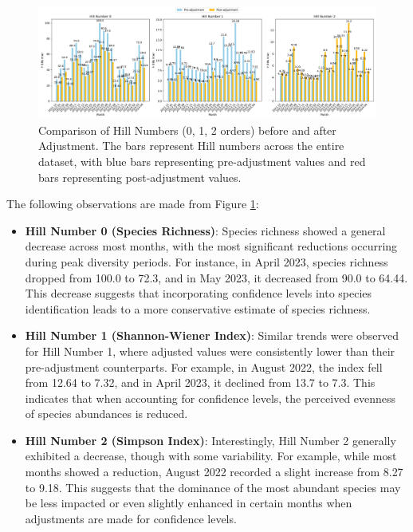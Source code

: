 \documentclass[a4paper,12pt]{article}
\begin{document}
\begin{figure}[H]
\centering
\includegraphics[width=1.0\textwidth]{Figures/Hill_Number.png}
\caption{Comparison of Hill Numbers (0, 1, 2 orders) before and after Adjustment. The bars represent Hill numbers across the entire dataset, with blue bars representing pre-adjustment values and red bars representing post-adjustment values.}
\label{fig:hill_numbers}
\end{figure}

The following observations are made from Figure \ref{fig:hill_numbers}:

\begin{itemize}
    \item \textbf{Hill Number 0 (Species Richness)}: Species richness showed a general decrease across most months, with the most significant reductions occurring during peak diversity periods. For instance, in April 2023, species richness dropped from 100.0 to 72.3, and in May 2023, it decreased from 90.0 to 64.44. This decrease suggests that incorporating confidence levels into species identification leads to a more conservative estimate of species richness.

    \item \textbf{Hill Number 1 (Shannon-Wiener Index)}: Similar trends were observed for Hill Number 1, where adjusted values were consistently lower than their pre-adjustment counterparts. For example, in August 2022, the index fell from 12.64 to 7.32, and in April 2023, it declined from 13.7 to 7.3. This indicates that when accounting for confidence levels, the perceived evenness of species abundances is reduced.

    \item \textbf{Hill Number 2 (Simpson Index)}: Interestingly, Hill Number 2 generally exhibited a decrease, though with some variability. For example, while most months showed a reduction, August 2022 recorded a slight increase from 8.27 to 9.18. This suggests that the dominance of the most abundant species may be less impacted or even slightly enhanced in certain months when adjustments are made for confidence levels.
\end{itemize}
\end{document}

